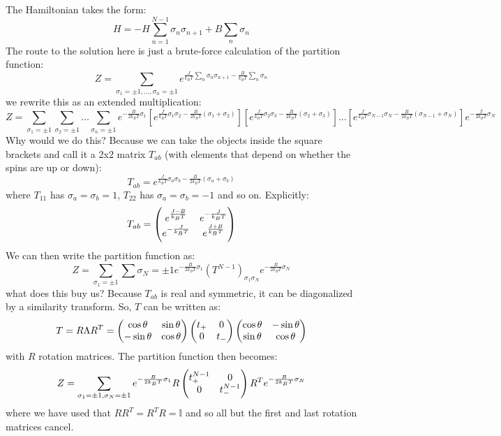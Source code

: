 The Hamiltonian takes the form:
\begin{equation}
    H = -H\sum_{n=1}^{N-1}\sigma_n \sigma_{n+1} + B\sum_n \sigma_n
\end{equation}
The route to the solution here is just a brute-force calculation of the partition function:
\begin{equation}
    Z = \sum_{\sigma_1 = \pm 1, \ldots, \sigma_n = \pm 1} e^{\frac{J}{k_B T}\sum_n \sigma_n \sigma_{n+1} - \frac{B}{k_B T}\sum_{n}\sigma_n}
\end{equation}
we rewrite this as an extended multiplication:
\begin{equation}
    Z = \sum_{\sigma_1 = \pm 1} \sum_{\sigma_2 = \pm 1} \ldots \sum_{\sigma_n = \pm 1}e^{-\frac{B}{2k_B T}\sigma_1}\left[e^{\frac{J}{k_B T}\sigma_1 \sigma_2 - \frac{B}{2k_B T}(\sigma_1 + \sigma_2)}\right]\left[e^{\frac{J}{k_B T}\sigma_2 \sigma_3 - \frac{B}{2k_B T}(\sigma_2 + \sigma_3)}\right] \ldots \left[e^{\frac{J}{k_B T}\sigma_{N-1} \sigma_N - \frac{B}{2k_B T}(\sigma_{N-1} + \sigma_N)}\right]e^{-\frac{\beta}{2k_B T}\sigma_N}
\end{equation}
Why would we do this? Because we can take the objects inside the square brackets and call it a 2x2 matrix $T_{ab}$ (with elements that depend on whether the spins are up or down):
\begin{equation}
    T_{ab} = e^{\frac{J}{k_B T}\sigma_a \sigma_b - \frac{B}{2k_B T}(\sigma_a + \sigma_b)}
\end{equation}
where $T_{11}$ has $\sigma_a = \sigma_b = 1$, $T_{22}$ has $\sigma_a = \sigma_b = -1$ and so on. Explicitly:
\begin{equation}
    T_{ab} = \begin{pmatrix}e^{\frac{J-B}{k_B T}} & e^{-\frac{J}{k_B T}} \\ e^{-\frac{J}{k_B T}} & e^{\frac{J + B}{k_B T}}\end{pmatrix}
\end{equation}
We can then write the partition function as:
\begin{equation}
    Z = \sum_{\sigma_1 = \pm 1}\sum{\sigma_N = \pm 1} e^{-\frac{B}{2k_B T}\sigma_1}(T^{N-1})_{\sigma_1\sigma_N} e^{-\frac{B}{2k_B T}\sigma_N}
\end{equation}
what does this buy us? Because $T_{ab}$ is real and symmetric, it can be diagonalized by a similarity transform. So, $T$ can be written as:
\begin{equation}
    T = R\Lambda R^T = \begin{pmatrix}\cos\theta & \sin\theta \\ -\sin\theta & \cos\theta\end{pmatrix}\begin{pmatrix}t_+ & 0 \\ 0 & t_-\end{pmatrix}\begin{pmatrix}\cos\theta & -\sin\theta \\ \sin\theta & \cos\theta\end{pmatrix}
\end{equation}
with $R$ rotation matrices. The partition function then becomes:
\begin{equation}
    Z = \sum_{\sigma_1 = \pm 1, \sigma_N = \pm 1} e^{-\frac{B}{2k_B T}\sigma_1}R\begin{pmatrix}t_+^{N-1} & 0 \\ 0 & t_-^{N-1}\end{pmatrix}R^T e^{-\frac{B}{2k_B T}\sigma_N}
\end{equation}
where we have used that $RR^T = R^TR = \mathbb{I}$ and so all but the first and last rotation matrices cancel. 

